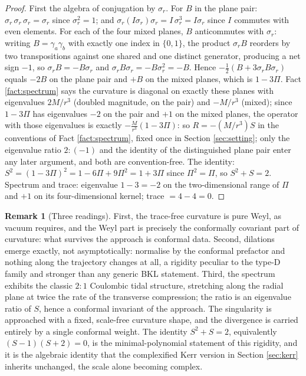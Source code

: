 \documentclass[11pt]{article}
\theoremstyle{definition}
\newtheorem{remark}[theorem]{Remark}
\begin{document}
\begin{proof}
First the algebra of conjugation by $\sigma_r$. For $B$ in the plane pair: $\sigma_r\,\sigma_r\,\sigma_r = \sigma_r$ since $\sigma_r^2 = 1$; and $\sigma_r (I\sigma_r)\sigma_r = I\,\sigma_r^3 = I\sigma_r$ since $I$ commutes with even elements. For each of the four mixed planes, $B$ anticommutes with $\sigma_r$: writing $B = \gamma_a\gamma_b$ with exactly one index in $\{0,1\}$, the product $\sigma_r B$ reorders by two transpositions against one shared and one distinct generator, producing a net sign $-1$, so $\sigma_r B = -B\sigma_r$ and $\sigma_r B \sigma_r = -B\sigma_r^2 = -B$. Hence $-\tfrac12(B + 3\sigma_r B\sigma_r)$ equals $-2B$ on the plane pair and $+B$ on the mixed planes, which is $1 - 3\Pi$. Fact \ref{fact:spectrum} says the curvature is diagonal on exactly these planes with eigenvalues $2M/r^3$ (doubled magnitude, on the pair) and $-M/r^3$ (mixed); since $1 - 3\Pi$ has eigenvalues $-2$ on the pair and $+1$ on the mixed planes, the operator with those eigenvalues is exactly $-\tfrac{M}{r^3}(1 - 3\Pi)$: so $R = -(M/r^3)S$ in the conventions of Fact \ref{fact:spectrum}, fixed once in Section \ref{sec:setting}; only the eigenvalue ratio $2 : (-1)$ and the identity of the distinguished plane pair enter any later argument, and both are convention-free. The identity: $S^2 = (1 - 3\Pi)^2 = 1 - 6\Pi + 9\Pi^2 = 1 + 3\Pi$ since $\Pi^2 = \Pi$, so $S^2 + S = 2$. Spectrum and trace: eigenvalue $1 - 3 = -2$ on the two-dimensional range of $\Pi$ and $+1$ on its four-dimensional kernel; trace $= 4 - 4 = 0$.
\end{proof}

\begin{remark}[Three readings]\label{rem:threereadings}
First, the trace-free curvature is pure Weyl, as vacuum requires, and the Weyl part is precisely the conformally covariant part of curvature: what survives the approach is conformal data. Second, dilations emerge exactly, not asymptotically: normalise by the conformal prefactor and nothing along the trajectory changes at all, a rigidity peculiar to the type-D family and stronger than any generic BKL statement. Third, the spectrum exhibits the classic $2{:}1$ Coulombic tidal structure, stretching along the radial plane at twice the rate of the transverse compression; the ratio is an eigenvalue ratio of $S$, hence a conformal invariant of the approach. The singularity is approached with a fixed, scale-free curvature shape, and the divergence is carried entirely by a single conformal weight. The identity $S^2 + S = 2$, equivalently $(S-1)(S+2) = 0$, is the minimal-polynomial statement of this rigidity, and it is the algebraic identity that the complexified Kerr version in Section \ref{sec:kerr} inherits unchanged, the scale alone becoming complex.
\end{remark}
\end{document}
